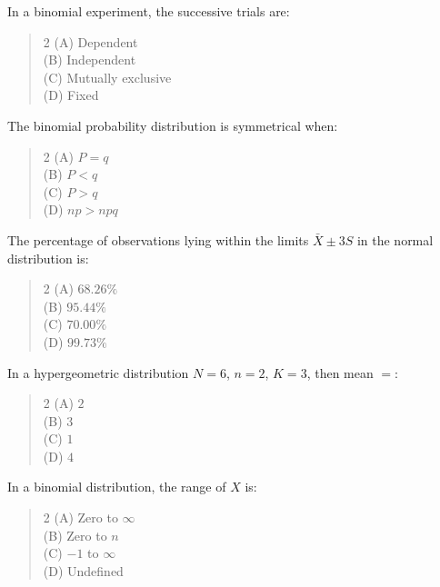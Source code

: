 \documentclass[11pt,a4paper]{article}
\begin{document}
\begin{mcqlist}
\item In a binomial experiment, the successive trials are:
\begin{quote}\begin{multicols}{2}
\noindent (A) Dependent \\
(B) Independent \\
(C) Mutually exclusive \\
(D) Fixed
\end{multicols}\end{quote}

\item The binomial probability distribution is symmetrical when:
\begin{quote}\begin{multicols}{2}
\noindent (A) $P=q$ \\
(B) $P<q$ \\
(C) $P>q$ \\
(D) $np>npq$
\end{multicols}\end{quote}

\item The percentage of observations lying within the limits $\bar{X}\pm 3S$ in the normal distribution is:
\begin{quote}\begin{multicols}{2}
\noindent (A) $68.26\%$ \\
(B) $95.44\%$ \\
(C) $70.00\%$ \\
(D) $99.73\%$
\end{multicols}\end{quote}

\item In a hypergeometric distribution $N=6$, $n=2$, $K=3$, then mean $=$:
\begin{quote}\begin{multicols}{2}
\noindent (A) $2$ \\
(B) $3$ \\
(C) $1$ \\
(D) $4$
\end{multicols}\end{quote}

\item In a binomial distribution, the range of $X$ is:
\begin{quote}\begin{multicols}{2}
\noindent (A) Zero to $\infty$ \\
(B) Zero to $n$ \\
(C) $-1$ to $\infty$ \\
(D) Undefined
\end{multicols}\end{quote}


\end{mcqlist}
\end{document}
